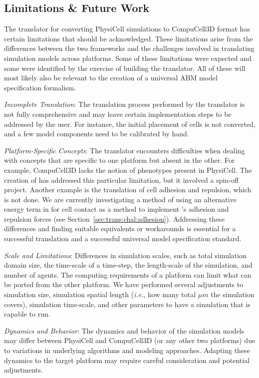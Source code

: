 \subsection{Limitations \& Future Work}\label{sec:trans:disc:lims}
The translator for converting PhysiCell simulations to CompuCell3D format has certain limitations that should be acknowledged. These limitations arise from the differences between the two frameworks and the challenges involved in translating simulation models across platforms. Some of these limitations were expected and some were identified by the exercise of building the translator. All of these will most likely also be relevant to the creation of a universal ABM model specification formalism.

\textit{Incomplete Translation}: The translation process performed by the translator is not fully comprehensive and may leave certain implementation steps to be addressed by the user. For instance, the initial placement of cells is not converted, and a few model components need to be calibrated by hand.

\textit{Platform-Specific Concepts}: The translator encounters difficulties when dealing with concepts that are specific to one platform but absent in the other. For example, CompuCell3D lacks the notion of phenotypes present in PhysiCell. The creation of \pcps has addressed this particular limitation, but it involved a spin-off project. Another example is the translation of cell adhesion and repulsion, which is not done. We are currently investigating a method of using an alternative energy term in \ccds for cell contact as a method to implement \psc's adhesion and repulsion forces
(see Section~\ref{sec:trans:chal:adhesion}). Addressing these differences and finding suitable equivalents or workarounds is essential for a successful translation and a successful universal model specification standard.

\textit{Scale and Limitations}: Differences in simulation scales, such as total simulation domain size, the time-scale of a time-step, the length-scale of the simulation, and number of agents. The computing requirements of a platform can limit what can be ported from the other platform. We have performed several adjustments to simulation size, simulation spatial length (\textit{i.e.}, how many total $\mu m$ the simulation covers), simulation time-scale, and other parameters to have a simulation that is capable to run.

\textit{Dynamics and Behavior}: The dynamics and behavior of the simulation models may differ between PhysiCell and CompuCell3D (or any other two platforms) due to variations in underlying algorithms and modeling approaches. Adapting these dynamics to the target platform may require careful consideration and potential adjustments.

